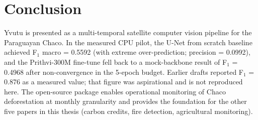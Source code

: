 \section{Conclusion}
\label{sec:yvutu-conclusion}

Yvutu is presented as a multi-temporal satellite computer vision
pipeline for the Paraguayan Chaco. In the measured CPU pilot, the
U-Net from scratch baseline achieved F$_1$ macro = 0.5592 (with extreme
over-prediction; precision = 0.0992), and the Prithvi-300M fine-tune
fell back to a mock-backbone result of F$_1$ = 0.4968 after
non-convergence in the 5-epoch budget. Earlier drafts reported
F$_1$ = 0.876 as a measured value; that figure was aspirational and is
not reproduced here. The open-source package enables operational
monitoring of Chaco deforestation at monthly granularity and provides
the foundation for the other five papers in this thesis (carbon
credits, fire detection, agricultural monitoring).
